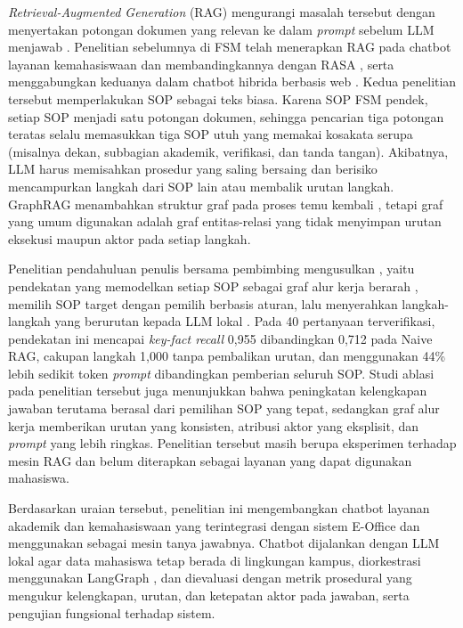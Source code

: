 \textit{Retrieval-Augmented Generation} (RAG) mengurangi masalah tersebut dengan menyertakan potongan dokumen yang relevan ke dalam \textit{prompt} sebelum LLM menjawab \parencite{lewis2020rag,gao2023ragsurvey}. Penelitian sebelumnya di FSM telah menerapkan RAG pada chatbot layanan kemahasiswaan dan membandingkannya dengan RASA \parencite{sutantio2026perbandingan}, serta menggabungkan keduanya dalam chatbot hibrida berbasis web \parencite{sahnah2026pengembangan}. Kedua penelitian tersebut memperlakukan SOP sebagai teks biasa. Karena SOP FSM pendek, setiap SOP menjadi satu potongan dokumen, sehingga pencarian tiga potongan teratas selalu memasukkan tiga SOP utuh yang memakai kosakata serupa (misalnya dekan, subbagian akademik, verifikasi, dan tanda tangan). Akibatnya, LLM harus memisahkan prosedur yang saling bersaing dan berisiko mencampurkan langkah dari SOP lain atau membalik urutan langkah. GraphRAG menambahkan struktur graf pada proses temu kembali \parencite{peng2024graphragsurvey,edge2024graphrag}, tetapi graf yang umum digunakan adalah graf entitas-relasi \parencite{guo2024lightrag,gutierrez2024hipporag} yang tidak menyimpan urutan eksekusi maupun aktor pada setiap langkah.

Penelitian pendahuluan penulis bersama pembimbing mengusulkan \wgr{}, yaitu pendekatan yang memodelkan setiap SOP sebagai graf alur kerja berarah \parencite{dumas2018fundamentals}, memilih SOP target dengan pemilih berbasis aturan, lalu menyerahkan langkah-langkah yang berurutan kepada LLM lokal \parencite{wiratama2026procedure}. Pada 40 pertanyaan terverifikasi, pendekatan ini mencapai \textit{key-fact recall} 0,955 dibandingkan 0,712 pada Naive RAG, cakupan langkah 1,000 tanpa pembalikan urutan, dan menggunakan 44\% lebih sedikit token \textit{prompt} dibandingkan pemberian seluruh SOP. Studi ablasi pada penelitian tersebut juga menunjukkan bahwa peningkatan kelengkapan jawaban terutama berasal dari pemilihan SOP yang tepat, sedangkan graf alur kerja memberikan urutan yang konsisten, atribusi aktor yang eksplisit, dan \textit{prompt} yang lebih ringkas. Penelitian tersebut masih berupa eksperimen terhadap mesin RAG dan belum diterapkan sebagai layanan yang dapat digunakan mahasiswa.

Berdasarkan uraian tersebut, penelitian ini mengembangkan chatbot layanan akademik dan kemahasiswaan yang terintegrasi dengan sistem E-Office dan menggunakan \wgr{} sebagai mesin tanya jawabnya. Chatbot dijalankan dengan LLM lokal agar data mahasiswa tetap berada di lingkungan kampus, diorkestrasi menggunakan LangGraph \parencite{langgraph2024}, dan dievaluasi dengan metrik prosedural yang mengukur kelengkapan, urutan, dan ketepatan aktor pada jawaban, serta pengujian fungsional terhadap sistem.


